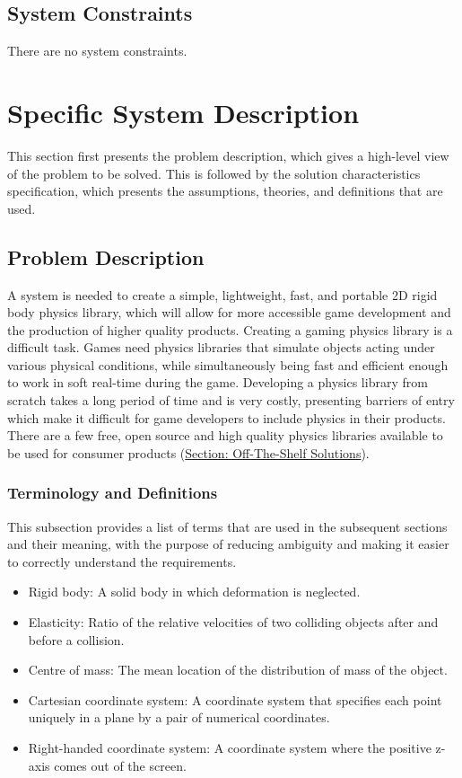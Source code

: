 \documentclass[12pt]{article}
\begin{document}
\subsection{System Constraints}
\label{Sec:SysConstraints}
There are no system constraints.
\section{Specific System Description}
\label{Sec:SpecSystDesc}
This section first presents the problem description, which gives a high-level view of the problem to be solved. This is followed by the solution characteristics specification, which presents the assumptions, theories, and definitions that are used.
\subsection{Problem Description}
\label{Sec:ProbDesc}
A system is needed to create a simple, lightweight, fast, and portable 2D rigid body physics library, which will allow for more accessible game development and the production of higher quality products. Creating a gaming physics library is a difficult task. Games need physics libraries that simulate objects acting under various physical conditions, while simultaneously being fast and efficient enough to work in soft real-time during the game. Developing a physics library from scratch takes a long period of time and is very costly, presenting barriers of entry which make it difficult for game developers to include physics in their products. There are a few free, open source and high quality physics libraries available to be used for consumer products (\hyperref[Sec:ExistingSolns]{Section: Off-The-Shelf Solutions}).
\subsubsection{Terminology and Definitions}
\label{Sec:TermDefs}
This subsection provides a list of terms that are used in the subsequent sections and their meaning, with the purpose of reducing ambiguity and making it easier to correctly understand the requirements.
\begin{itemize}
\item{Rigid body: A solid body in which deformation is neglected.}
\item{Elasticity: Ratio of the relative velocities of two colliding objects after and before a collision.}
\item{Centre of mass: The mean location of the distribution of mass of the object.}
\item{Cartesian coordinate system: A coordinate system that specifies each point uniquely in a plane by a pair of numerical coordinates.}
\item{Right-handed coordinate system: A coordinate system where the positive z-axis comes out of the screen.}
\end{itemize}
\end{document}

